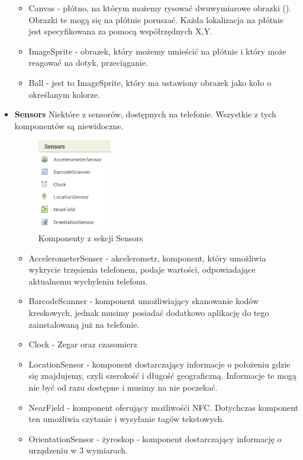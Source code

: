 \begin{itemize}
\begin{itemize}
\item Canvas - płótno, na którym możemy rysować dwuwymiarowe obrazki (). Obrazki te mogą się na płótnie poruszać. Każda lokalizacja na płótnie jest specyfikowana za pomocą współrzędnych X,Y.
\item ImageSprite - obrazek, który możemy umieścić na płótnie i który może reagować na dotyk, przeciąganie.
\item Ball - jest to ImageSprite, który ma ustawiony obrazek jako koło o określanym kolorze.
\end{itemize}

\item \textbf{Sensors} Niektóre z sensorów, dostępnych na telefonie. Wszystkie z tych komponentów są niewidoczne.

\begin{figure}[H] 
\centering\includegraphics[height=4cm]{figures/components/sensors}
\caption{Komponenty z sekcji Sensors}
\end{figure}

\begin{itemize}
\item AccelerometerSenser - akcelerometr, komponent, który umożliwia wykrycie trzęsienia telefonem, podaje wartości, odpowiadające aktualnemu wychyleniu telefonu.
\item BarcodeScanner - komponent umożliwiający skanowanie kodów kreskowych, jednak musimy posiadać dodatkowo aplikację do tego zainstalowaną już na telefonie.
\item Clock - Zegar oraz czasomierz
\item LocationSensor - komponent dostarczający informacje o położeniu gdzie się znajdujemy, czyli szerokość i długość geograficzną. Informacje te mogą nie być od razu dostępne i musimy na nie poczekać.
\item NearField - komponent oferujący możliwośći NFC. Dotychczas komponent ten umożliwia czytanie i wysyłanie tagów tekstowych.
\item OrientationSensor - żyroskop - komponent dostarczający informację o urządzeniu w 3 wymiarach.
\end{itemize}


\end{itemize}
